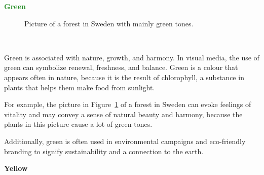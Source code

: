 \documentclass[../MasterThesis.tex]{subfiles}
\begin{document}
\textbf{\textcolor{ForestGreen}{Green}}

%
%
\begin{minipage}{0.5\textwidth}
	\begin{figure}[H]
		\begin{center}
			\caption[Picture of a forest in Sweden with mainly green tones.]{Picture of a forest in Sweden with mainly green tones.}
			\label{figure:green}
		\end{center}
	\end{figure}\hfill
\end{minipage}\begin{minipage}{0.05\textwidth}
	\ 
\end{minipage}\begin{minipage}{0.45\textwidth}
	Green is associated with nature, growth, and harmony. In visual media, the use of green can symbolize renewal, freshness, and balance. Green is a colour that appears often in nature, because it is the result of chlorophyll, a substance in plants that helps them make food from sunlight.~\cite{green, colour2}
	
	For example, the picture in Figure~\ref{figure:green} of a forest in Sweden can evoke feelings of vitality  and  may convey a sense of natural beauty and harmony, because the plants in this picture cause a lot of green tones.
	

	
	
\end{minipage}

	\vspace*{-0.6em}

	Additionally, green is often used in environmental campaigns and eco-friendly branding to signify sustainability and a connection to the earth. 








\newpage
\textbf{\textcolor{YellowOrange}{Yellow}}
\end{document}
